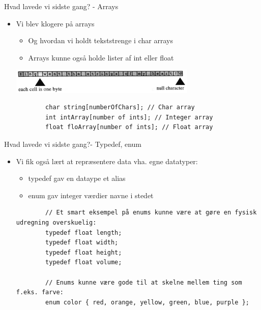 \documentclass{beamer}
\begin{document}
\begin{frame}[fragile]{Hvad lavede vi sidste gang? - Arrays}
	\begin{itemize}
		\item{Vi blev klogere på {\color{dkgreen}arrays}}
		\begin{itemize}
			\item{Og hvordan vi holdt tekststrenge i {\color{C_darkblue}char arrays}}
			\item{Arrays kunne også holde lister af {\color{C_darkblue}int} eller {\color{C_darkblue}float}}
		\end{itemize}
		\begin{center}
				\includegraphics[width=0.7\textwidth]{assets/char_array.png}
		\end{center}
		\begin{lstlisting}
		char string[numberOfChars]; // Char array
		int intArray[number of ints]; // Integer array 
		float floArray[number of ints]; // Float array 
		\end{lstlisting}
	\end{itemize}
\end{frame}

\begin{frame}[fragile]{Hvad lavede vi sidste gang?- Typedef, enum}
	\begin{itemize}
		\item{Vi fik også lært at repræsentere data vha. egne datatyper:}
		\begin{itemize}
			\item{{\color{C_darkblue}typedef} gav en dataype et alias}
			\item{{\color{C_darkblue}enum} gav integer værdier navne i stedet}
		\end{itemize}
		\begin{lstlisting}
		// Et smart eksempel på enums kunne være at gøre en fysisk udregning overskuelig:
		typedef float length;
		typedef float width;
		typedef float height;
		typedef float volume;

		// Enums kunne være gode til at skelne mellem ting som f.eks. farve:
		enum color { red, orange, yellow, green, blue, purple };
		\end{lstlisting}
	\end{itemize}
\end{frame}
\end{document}
